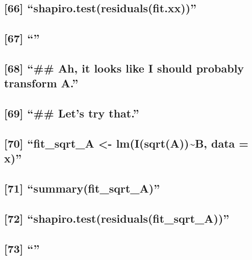 \documentclass[]{article}
\begin{document}
\subsection{\texorpdfstring{{[}66{]}
``shapiro.test(residuals(fit.xx))''}{{[}66{]} shapiro.test(residuals(fit.xx))}}\label{shapiro.testresidualsfit.xx}

\subsection{\texorpdfstring{{[}67{]} ``''}{{[}67{]} }}\label{section-18}

\subsection{\texorpdfstring{{[}68{]} ``\#\# Ah, it looks like I should
probably transform
A.''}{{[}68{]} \#\# Ah, it looks like I should probably transform A.}}\label{ah-it-looks-like-i-should-probably-transform-a.}

\subsection{\texorpdfstring{{[}69{]} ``\#\# Let's try
that.''}{{[}69{]} \#\# Let's try that.}}\label{lets-try-that.}

\subsection{\texorpdfstring{{[}70{]} ``fit\_sqrt\_A \textless{}-
lm(I(sqrt(A))\textasciitilde{}B, data =
x)''}{{[}70{]} fit\_sqrt\_A \textless{}- lm(I(sqrt(A))\textasciitilde{}B, data = x)}}\label{fit_sqrt_a---lmisqrtab-data-x}

\subsection{\texorpdfstring{{[}71{]}
``summary(fit\_sqrt\_A)''}{{[}71{]} summary(fit\_sqrt\_A)}}\label{summaryfit_sqrt_a}

\subsection{\texorpdfstring{{[}72{]}
``shapiro.test(residuals(fit\_sqrt\_A))''}{{[}72{]} shapiro.test(residuals(fit\_sqrt\_A))}}\label{shapiro.testresidualsfit_sqrt_a}

\subsection{\texorpdfstring{{[}73{]} ``''}{{[}73{]} }}\label{section-19}
\end{document}
